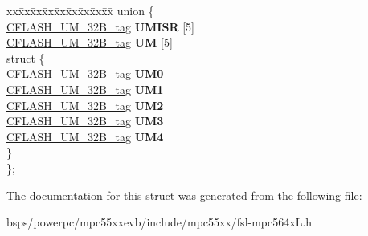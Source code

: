 \begin{DoxyCompactItemize}
\begin{tabbing}
\end{tabbing}\item 
\mbox{\label{structCFLASH__struct__tag_a9383a952ec22e06fff87b0572a92faab}} 
\begin{tabbing}
xx\=xx\=xx\=xx\=xx\=xx\=xx\=xx\=xx\=\kill
union \{\\
\>\mbox{\hyperlink{unionCFLASH__UM__32B__tag}{CFLASH\_UM\_32B\_tag}} {\bfseries UMISR} \mbox{[}5\mbox{]}\\
\>\mbox{\hyperlink{unionCFLASH__UM__32B__tag}{CFLASH\_UM\_32B\_tag}} {\bfseries UM} \mbox{[}5\mbox{]}\\
\mbox{\label{unionCFLASH__struct__tag_1_1_0D1505_ababc09b70b2c51f6941955615d22734f}} 
\>struct \{\\
\>\>\mbox{\hyperlink{unionCFLASH__UM__32B__tag}{CFLASH\_UM\_32B\_tag}} {\bfseries UM0}\\
\>\>\mbox{\hyperlink{unionCFLASH__UM__32B__tag}{CFLASH\_UM\_32B\_tag}} {\bfseries UM1}\\
\>\>\mbox{\hyperlink{unionCFLASH__UM__32B__tag}{CFLASH\_UM\_32B\_tag}} {\bfseries UM2}\\
\>\>\mbox{\hyperlink{unionCFLASH__UM__32B__tag}{CFLASH\_UM\_32B\_tag}} {\bfseries UM3}\\
\>\>\mbox{\hyperlink{unionCFLASH__UM__32B__tag}{CFLASH\_UM\_32B\_tag}} {\bfseries UM4}\\
\>\} \\
\}; \\

\end{tabbing}\end{DoxyCompactItemize}


The documentation for this struct was generated from the following file\+:\begin{DoxyCompactItemize}
\item 
bsps/powerpc/mpc55xxevb/include/mpc55xx/fsl-\/mpc564x\+L.\+h\end{DoxyCompactItemize}
